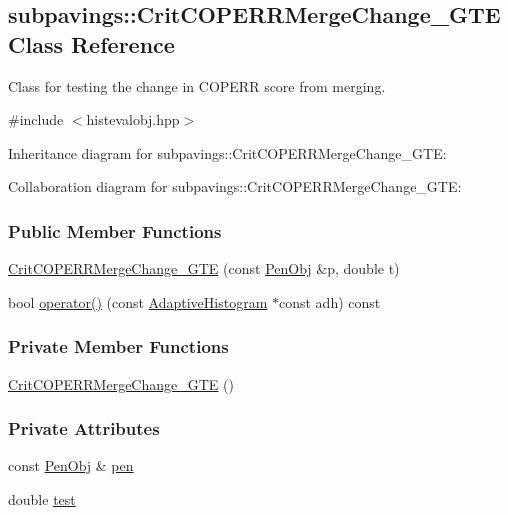 \hypertarget{classsubpavings_1_1CritCOPERRMergeChange__GTE}{\subsection{subpavings\-:\-:\-Crit\-C\-O\-P\-E\-R\-R\-Merge\-Change\-\_\-\-G\-T\-E \-Class \-Reference}
\label{classsubpavings_1_1CritCOPERRMergeChange__GTE}
}


\-Class for testing the change in \-C\-O\-P\-E\-R\-R score from merging.  




{\ttfamily \#include $<$histevalobj.\-hpp$>$}



\-Inheritance diagram for subpavings\-:\-:\-Crit\-C\-O\-P\-E\-R\-R\-Merge\-Change\-\_\-\-G\-T\-E\-:


\-Collaboration diagram for subpavings\-:\-:\-Crit\-C\-O\-P\-E\-R\-R\-Merge\-Change\-\_\-\-G\-T\-E\-:
\subsubsection*{\-Public \-Member \-Functions}
\begin{DoxyCompactItemize}
\item 
\hyperlink{classsubpavings_1_1CritCOPERRMergeChange__GTE_ac2237c8c6ed4c982628ac1d55d13d24d}{\-Crit\-C\-O\-P\-E\-R\-R\-Merge\-Change\-\_\-\-G\-T\-E} (const \hyperlink{classsubpavings_1_1PenObj}{\-Pen\-Obj} \&p, double t)
\item 
bool \hyperlink{classsubpavings_1_1CritCOPERRMergeChange__GTE_a00c06b462c0224bf90e06c130069bd13}{operator()} (const \hyperlink{classsubpavings_1_1AdaptiveHistogram}{\-Adaptive\-Histogram} $\ast$const adh) const 
\end{DoxyCompactItemize}
\subsubsection*{\-Private \-Member \-Functions}
\begin{DoxyCompactItemize}
\item 
\hyperlink{classsubpavings_1_1CritCOPERRMergeChange__GTE_a701e7cb62651e8e56e2288d4faa906ed}{\-Crit\-C\-O\-P\-E\-R\-R\-Merge\-Change\-\_\-\-G\-T\-E} ()
\end{DoxyCompactItemize}
\subsubsection*{\-Private \-Attributes}
\begin{DoxyCompactItemize}
\item 
const \hyperlink{classsubpavings_1_1PenObj}{\-Pen\-Obj} \& \hyperlink{classsubpavings_1_1CritCOPERRMergeChange__GTE_a33a7866852738c521e35e05e1eb7eb5a}{pen}
\item 
double \hyperlink{classsubpavings_1_1CritCOPERRMergeChange__GTE_ac7f461e466592ee2b94c701bf6969f84}{test}
\end{DoxyCompactItemize}


